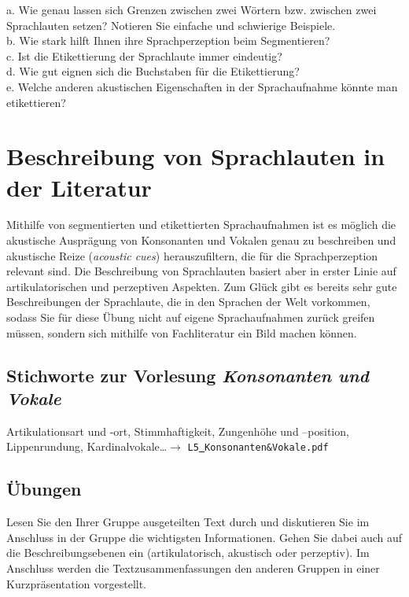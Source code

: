 \documentclass[11pt]{book}
\begin{document}
a.	Wie genau lassen sich Grenzen zwischen zwei Wörtern bzw. zwischen zwei Sprachlauten setzen? Notieren Sie einfache und schwierige Beispiele. \vspace{5cm}\\
b.	Wie stark hilft Ihnen ihre Sprachperzeption beim Segmentieren? \vspace{5cm}\\
\newpage
c.	Ist die Etikettierung der Sprachlaute immer eindeutig? \vspace{5cm}\\
d.	Wie gut eignen sich die Buchstaben für die Etikettierung? \vspace{5cm}\\
e.	Welche anderen akustischen Eigenschaften in der Sprachaufnahme könnte man etikettieren? \vspace*{5cm}\\






\chapter{Beschreibung von Sprachlauten in der Literatur}

Mithilfe von segmentierten und etikettierten Sprachaufnahmen ist es möglich die akustische Ausprägung von Konsonanten und Vokalen genau zu beschreiben und akustische Reize (\emph{acoustic cues}) herauszufiltern, die für die Sprachperzeption relevant sind. Die Beschreibung von Sprachlauten basiert aber in erster Linie auf artikulatorischen und perzeptiven Aspekten. Zum Glück gibt es bereits sehr gute Beschreibungen der Sprachlaute, die in den Sprachen der Welt vorkommen, sodass Sie für diese Übung nicht auf eigene Sprachaufnahmen zurück greifen müssen, sondern sich mithilfe von Fachliteratur ein Bild machen können.

\section{Stichworte zur Vorlesung \em{Konsonanten und Vokale}}
Artikulationsart und -ort, Stimmhaftigkeit, Zungenhöhe und –position, Lippenrundung, Kardinalvokale\dots $\rightarrow$ {\tt L5\underline{\ }Konsonanten{\&}Vokale.pdf}

\section{Übungen}
Lesen Sie den Ihrer Gruppe ausgeteilten Text durch und diskutieren Sie im Anschluss in der Gruppe die wichtigsten Informationen. Gehen Sie dabei auch auf die Beschreibungsebenen ein (artikulatorisch, akustisch oder perzeptiv). Im Anschluss werden die Textzusammenfassungen den anderen Gruppen in einer Kurzpräsentation vorgestellt.
\newline
\end{document}
